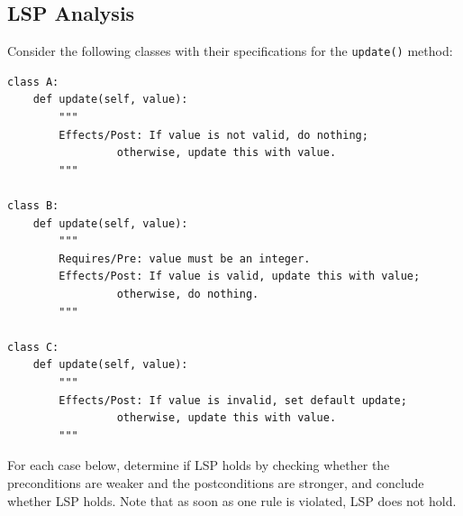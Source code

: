 \documentclass[oneside,11pt,dvipsnames]{book}
\newcommand{\code}[1]{\texttt{#1}}
\begin{document}
\subsection{LSP Analysis}\label{exercise:lsp-analysis}

Consider the following classes with their specifications for the \code{update()} method:

\begin{lstlisting}
class A:
    def update(self, value):
        """
        Effects/Post: If value is not valid, do nothing;
                 otherwise, update this with value.
        """

class B:
    def update(self, value):
        """
        Requires/Pre: value must be an integer.
        Effects/Post: If value is valid, update this with value;
                 otherwise, do nothing.
        """

class C:
    def update(self, value):
        """
        Effects/Post: If value is invalid, set default update;
                 otherwise, update this with value.
        """
\end{lstlisting}    

For each case below, determine if LSP holds by checking whether the preconditions are weaker and the postconditions are stronger, and conclude whether LSP holds. Note that as soon as one rule is violated, LSP does not hold. 
\end{document}
